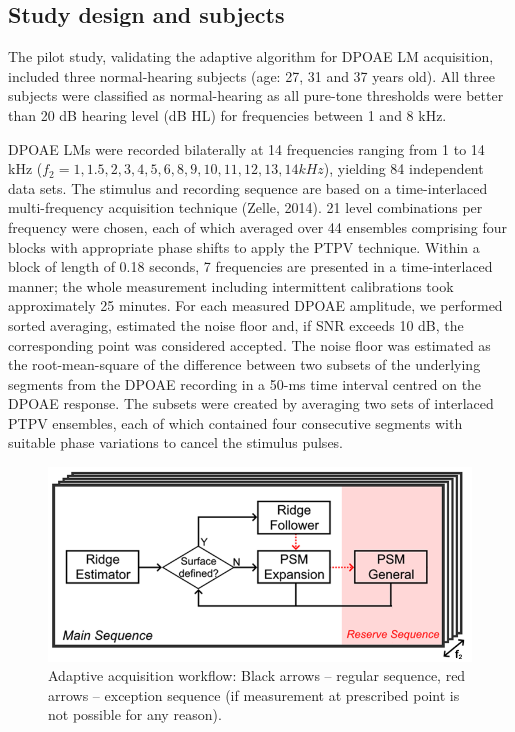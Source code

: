 \documentclass[journal,twoside,web]{ieeecolor2}
\begin{document}
\subsection{Study design and subjects}

The pilot study, validating the adaptive algorithm for DPOAE LM acquisition, included three normal-hearing subjects (age: 27, 31 and 37 years old). All three subjects were classified as normal-hearing as all pure-tone thresholds were better than 20 dB hearing level (dB HL) for frequencies between 1 and 8 kHz.

DPOAE LMs were recorded bilaterally at 14 frequencies ranging from 1 to 14 kHz ($f_2 = 1, 1.5, 2, 3, 4, 5, 6, 8, 9, 10, 11, 12, 13, 14 kHz$), yielding 84 independent data sets. The stimulus and recording sequence are based on a time-interlaced multi-frequency acquisition technique (Zelle, 2014).  21 level combinations per frequency were chosen, each of which averaged over 44 ensembles comprising four blocks with appropriate phase shifts to apply the PTPV technique. Within a block of length of 0.18 seconds, 7 frequencies are presented in a time-interlaced manner; the whole measurement including intermittent calibrations took approximately 25 minutes. For each measured DPOAE amplitude, we performed sorted averaging, estimated the noise floor and, if SNR exceeds 10 dB, the corresponding point was considered accepted. The noise floor was estimated as the root-mean-square of the difference between two subsets of the underlying segments from the DPOAE recording in a 50-ms time interval centred on the DPOAE response. The subsets were created by averaging two sets of interlaced PTPV ensembles, each of which contained four consecutive segments with suitable phase variations to cancel the stimulus pulses. 

\begin{figure}[ht]
\centerline{\includegraphics[width=\columnwidth]{Fig_Sequence.png}}
\caption{Adaptive acquisition workflow: Black arrows – regular sequence, red arrows – exception sequence (if measurement at prescribed point is not possible for any reason).}
\label{fig_SQS}
\end{figure}
\end{document}
